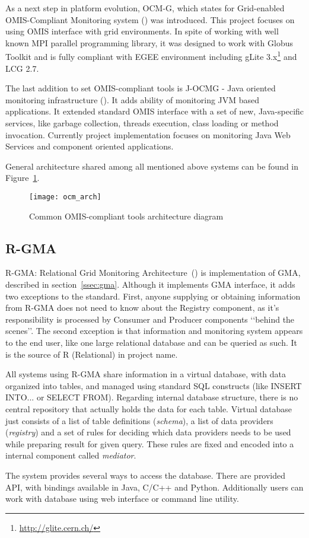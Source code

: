 As a next step in platform evolution, OCM-G, which states for Grid-enabled OMIS-Compliant Monitoring system (\cite{axgrid03b}) was introduced.
This project focuses on using OMIS interface with grid environments.  In spite of working with well known MPI parallel programming library, it was
designed to work with Globus Toolkit and is fully compliant with EGEE environment including gLite 3.x\footnote{\url{http://glite.cern.ch/}} and LCG
2.7. 

The last addition to set OMIS-compliant tools is J-OCMG - Java oriented monitoring infrastructure (\cite{jocm}). It adds ability of monitoring JVM
based applications. It extended standard OMIS interface with a set of new, Java-specific services, like garbage collection, threads execution, class
loading or method invocation. Currently project implementation focuses on monitoring Java Web Services and component oriented applications.

General architecture shared among all mentioned above systems can be found in Figure~\ref{fig:ocmg}.

\begin{figure}[ht]
  \centering
  \texttt{[image: ocm\_arch]}
  \caption{Common OMIS-compliant tools architecture diagram}
  \label{fig:ocmg}
\end{figure}
 
\subsection{R-GMA}

R-GMA: Relational Grid Monitoring Architecture~(\cite{RGMA1,RGMA2,RGMA3}) is implementation of GMA, described in section~\ref{ssec:gma}.
Although it implements GMA interface, it adds two exceptions to the standard. First, anyone supplying or obtaining information from R-GMA does
not need to know about the Registry component, as it\rq{}s responsibility is processed by Consumer and Producer components \lq\lq{}behind the
scenes\rq\rq{}. The second exception is that information and monitoring system appears to the end user, like one large relational database and can be queried as such. It is the source of R (Relational) in project name.

All systems using R-GMA share information in a virtual database, with data organized into tables, and managed using standard SQL constructs (like
INSERT INTO... or SELECT FROM). Regarding internal database structure, there is no central repository that actually holds the data for each
table. Virtual database just consists of a list of table definitions (\emph{schema}), a list of data providers (\emph{registry}) and a set of rules for
deciding which data providers needs to be used while preparing result for given query. These rules are fixed and encoded into a internal
component called \emph{mediator}.

The system provides several ways to access the database. There are provided API, with bindings available in Java, C/C++ and Python. Additionally
users can work with database using web interface or command line utility.
